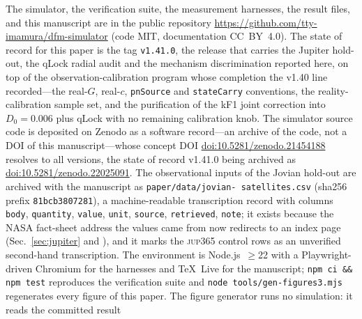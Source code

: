 \documentclass[aps,reprint,amsmath,amssymb,nofootinbib,superscriptaddress,floatfix]{revtex4-2}
\begin{document}
The simulator, the verification suite, the measurement harnesses, the
result files, and this manuscript are in the public repository
\url{https://github.com/tty-imamura/dfm-simulator} (code MIT,
documentation CC~BY~4.0).
The state of record for this paper is the tag \texttt{v1.41.0}, the
release that carries the Jupiter hold-out, the qLock radial audit and
the mechanism discrimination reported here, on top of the
observation-calibration program whose completion the v1.40 line
recorded---the real-$G$, real-$c$, \texttt{pnSource} and
\texttt{stateCarry} conventions, the reality-calibration sample set,
and the purification of the kF1 joint correction into
$D_0=0.006$ plus qLock with no remaining calibration knob.
The simulator source code is deposited on Zenodo as a software
record---an archive of the code, not a DOI of this manuscript---whose
concept DOI
\href{https://doi.org/10.5281/zenodo.21454188}
{doi:10.5281/zenodo.21454188} resolves to all versions, the state of
record v1.41.0 being archived as
\href{https://doi.org/10.5281/zenodo.22025091}
{doi:10.5281/zenodo.22025091}.
The observational inputs of the Jovian hold-out are archived with the
manuscript as
\texttt{paper/\allowbreak data/\allowbreak jovian-\allowbreak
satellites.csv} (sha256 prefix \texttt{81bcb3807281}), a
machine-readable transcription record with columns \texttt{body},
\texttt{quantity}, \texttt{value}, \texttt{unit}, \texttt{source},
\texttt{retrieved}, \texttt{note}; it exists because the NASA
fact-sheet address the values came from now redirects to an index page
(Sec.~\ref{sec:jupiter} and \cite{NASASats}), and it marks the
\textsc{jup365} control rows as an unverified second-hand
transcription.
The environment is Node.js~$\geq$22 with a Playwright-driven Chromium
for the harnesses and TeX~Live for the manuscript;
\texttt{npm ci \&\& npm test} reproduces the verification suite and
\texttt{node tools/gen-figures3.mjs} regenerates every figure of this
paper.
The figure generator runs no simulation: it reads the committed result
\end{document}

